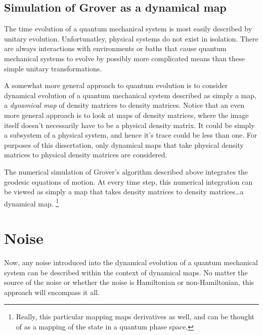 \subsection{Simulation of Grover as a dynamical map}

The time evolution of a quantum mechanical system is most easily
described by unitary evolution.
Unfortunatley, physical systems do not exist in isolation.  There
are always interactions with environments or baths that cause
quantum mechanical systems to evolve by possibly more complicated
means than these simple unitary transformations.

A somewhat more general approach to quantum evolution is to 
consider dynamical evolution of a quantum mechanical system
described as simply a map, a \emph{dynamical map}\cite{Sudarshan:??}
of density matrices to density matrices.
Notice that an even more general approach is to look at maps of 
density matrices, where the image itself doesn't necessarily have to
be a physical density matrix.  It could be simply a subsystem
of a physical system, and hence it's trace could be less than
one.  For purposes of this dissertation, only dynamical maps that
take physical density matrices to physical density matrices are
considered.


The numerical simulation of Grover's algorithm described above
integrates the geodesic equations of motion.  At every time step,
this numerical integration can be viewed as simply a map that
takes density matrices to density matrices\dots a dynamical map.
\footnote{Really, this particular mapping maps derivatives as well, and
can be thought of as a mapping of the state in a quantum phase 
space.}

\section{Noise}

Now, any noise introduced into the dynamical evolution of a 
quantum mechanical system can be described within the context 
of dynamical maps.  
No matter the source of the noise or whether the noise is 
Hamiltonian or non-Hamiltonian, this approach will encompass
it all.


